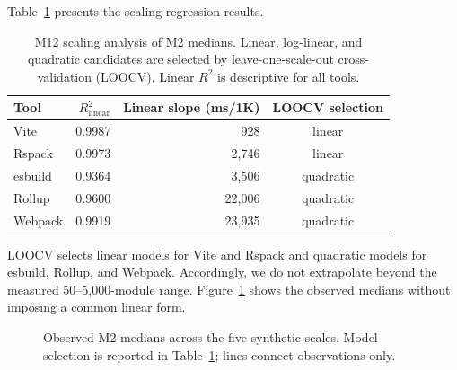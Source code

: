\documentclass[preprint,12pt]{elsarticle}
\begin{document}
Table~\ref{tab:scaling} presents the scaling regression results.

\begin{table}[htbp]
\centering
\caption{M12 scaling analysis of M2 medians. Linear, log-linear, and quadratic candidates are selected by leave-one-scale-out cross-validation (LOOCV). Linear $R^2$ is descriptive for all tools.}\label{tab:scaling}
\begin{tabular}{@{}lrrc@{}}
\toprule
\textbf{Tool} & $R^2_\text{linear}$ & \textbf{Linear slope (ms/1K)} & \textbf{LOOCV selection} \\
\midrule
Vite     & 0.9987 &    928 & linear \\
Rspack   & 0.9973 &  2{,}746 & linear \\
esbuild  & 0.9364 &  3{,}506 & quadratic \\
Rollup   & 0.9600 & 22{,}006 & quadratic \\
Webpack  & 0.9919 & 23{,}935 & quadratic \\
\bottomrule
\end{tabular}
\end{table}

LOOCV selects linear models for Vite and Rspack and quadratic models for esbuild, Rollup, and Webpack.
Accordingly, we do not extrapolate beyond the measured 50--5{,}000-module range.
Figure~\ref{fig:scaling} shows the observed medians without imposing a common linear form.

\begin{figure}[htbp]
\centering
{}
\caption{Observed M2 medians across the five synthetic scales. Model selection is reported in Table~\ref{tab:scaling}; lines connect observations only.}\label{fig:scaling}
\end{figure}
\end{document}
